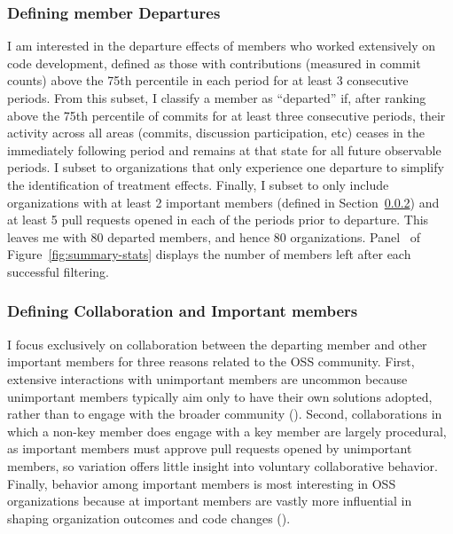 \documentclass[12pt,notitlepage]{article}
\begin{document}
\subsubsection{Defining member Departures}
I am interested in the departure effects of members who worked extensively on code development, defined as those with contributions (measured in commit counts) above the 75th percentile in each period for at least 3 consecutive periods. From this subset, I classify a member as “departed” if, after ranking above the 75th percentile of commits for at least three consecutive periods, their activity across all areas (commits, discussion participation, etc) ceases in the immediately following period and remains at that state for all future observable periods. I subset to organizations that only experience one departure to simplify the identification of treatment effects. Finally, I subset to only include organizations with at least 2 important members (defined in Section~\ref{sec:collab_imp_contr}) and at least 5 pull requests opened in each of the periods prior to departure. This leaves me with 80 departed members, and hence 80 organizations. Panel~ of Figure~\ref{fig:summary-stats} displays the number of members left after each successful filtering. 


\subsubsection{Defining Collaboration and Important members} \label{sec:collab_imp_contr}

I focus exclusively on collaboration between the departing member and other important members for three reasons related to the OSS community. First, extensive interactions with unimportant members are uncommon because unimportant members typically aim only to have their own solutions adopted, rather than to engage with the broader community (\cite{hippel_open_2003}). Second, collaborations in which a non-key member does engage with a key member are largely procedural, as important members must approve pull requests opened by unimportant members, so variation offers little insight into voluntary collaborative behavior. Finally, behavior among important members is most interesting in OSS organizations because at important members are vastly more influential in shaping organization outcomes and code changes (\cite{crowston_core_2006}). 
\end{document}
